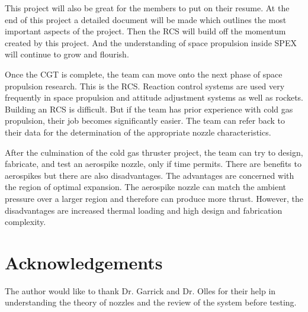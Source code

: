 \documentclass[conference]{IEEEtran} %
\begin{document}
This project will also be great for
the members to put on their resume. At the end of this project a detailed document will be made which outlines the most important aspects of the project.
Then the RCS will build off the momentum created by this project. And the understanding of space propulsion inside SPEX will continue to grow and flourish.

Once the CGT is complete, the team can move onto the next phase of space propulsion research. This is the RCS\@. Reaction control systems are used very
frequently in space propulsion and attitude adjustment systems as well as rockets. Building an RCS is difficult. But if the team
has prior experience with cold gas propulsion, their job becomes significantly easier. The team can refer back to their data for the determination of the
appropriate nozzle characteristics.

After the culmination of the cold gas thruster project, the team can try to design, fabricate, and test an aerospike nozzle, only if time permits.
There are benefits to aerospikes but there are also disadvantages. The advantages are concerned with the region of optimal expansion. The aerospike nozzle can match the
ambient pressure over a larger region and therefore can produce more thrust. However, the disadvantages are increased thermal loading and high design and fabrication complexity\cite{SPAD}.

\section*{Acknowledgements}
The author would like to thank Dr. Garrick and Dr. Olles for their help in understanding the theory of nozzles and the review of the system before testing.


\onecolumn
\appendices{}
\end{document}
